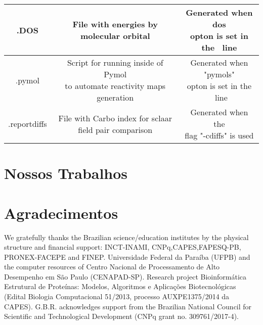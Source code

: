 \documentclass[a4paper,11pt]{refart}
\begin{document}
\begin{minipage}{\fullwidth}
\begin{table}[H]
\begin{tabular}{c|c|c}
			.DOS& File with energies by molecular orbital  & \makecell{Generated when dos \\ opton is set in the \ line} \\ \hline
			.pymol	&  \makecell{Script for running inside of Pymol \\to automate reactivity maps generation}   &  \makecell{Generated when "pymols" \\ opton is set in the \ line} \\ \hline
			.reportdiffs &  File with Carbo index for sclaar field pair comparison & \makecell{ Generated when the\\ flag "-cdiffs" is used }\\ 
			\bottomrule
		\end{tabular} 
		\label{tab4}	
	\end{table}	
\end{minipage}

\section{Nossos Trabalhos}

\newpage
\section*{Agradecimentos}

We gratefully thanks the Brazilian science/education institutes by the physical structure and financial support: INCT-INAMI, CNPq,CAPES,FAPESQ-PB, PRONEX-FACEPE and FINEP. Universidade Federal da Paraíba (UFPB) and the computer resources of Centro Nacional de Processamento de Alto Desempenho em São Paulo (CENAPAD-SP). 		
Research project Bioinformática Estrutural de Proteínas: Modelos, Algoritmos e Aplicações Biotecnológicas (Edital Biologia Computacional 51/2013, processo AUXPE1375/2014 da CAPES). G.B.R. acknowledges support from the Brazilian National Council for Scientific and Technological Development (CNPq grant no. 309761/2017-4).




\newpage






\end{document}
